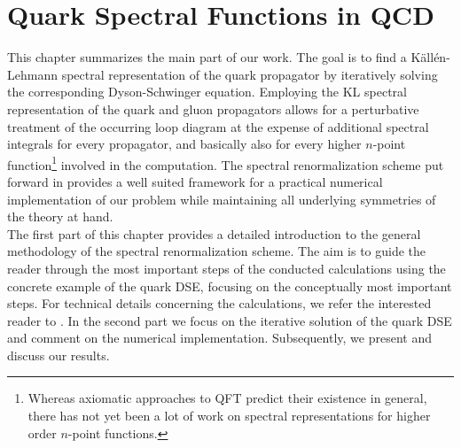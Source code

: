 \chapter{Quark Spectral Functions in QCD}\label{chap:results}
This chapter summarizes the main part of our work. The goal  is to find a K\"all\'{e}n-Lehmann spectral representation of the quark propagator by iteratively solving the corresponding Dyson-Schwinger equation. Employing the KL spectral representation of the quark and gluon propagators allows for a perturbative treatment of the occurring loop diagram at the expense of additional spectral integrals for every propagator, and basically also for every higher $n$-point function\footnote{Whereas axiomatic approaches to QFT predict their existence in general, there has not yet been a lot of work on spectral representations for higher order $n$-point functions. } involved in the computation. The spectral renormalization scheme put forward in \cite{Horak2019,Wink2020,HorakPawlowskiWink2020} provides a well suited  framework for a practical numerical implementation of our problem while maintaining all underlying symmetries of the theory at hand.\\
 The first part of this chapter provides a detailed introduction to the general methodology of the spectral renormalization scheme. The aim  is to guide the reader through the most important steps of the conducted calculations using the concrete example of the quark DSE, focusing on the conceptually most important steps. For technical details concerning the calculations, we refer the interested reader to .
In the second part we focus on the iterative solution of the quark DSE and comment on the numerical implementation. Subsequently, we present and discuss our results.

